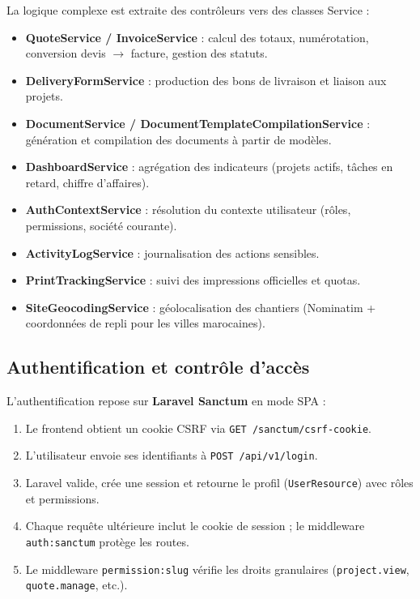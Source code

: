 La logique complexe est extraite des contrôleurs vers des classes Service :

\begin{itemize}
  \item \textbf{QuoteService / InvoiceService} : calcul des totaux, numérotation,
  conversion devis $\rightarrow$ facture, gestion des statuts.
  \item \textbf{DeliveryFormService} : production des bons de livraison et liaison
  aux projets.
  \item \textbf{DocumentService / DocumentTemplateCompilationService} : génération
  et compilation des documents à partir de modèles.
  \item \textbf{DashboardService} : agrégation des indicateurs (projets actifs,
  tâches en retard, chiffre d'affaires).
  \item \textbf{AuthContextService} : résolution du contexte utilisateur (rôles,
  permissions, société courante).
  \item \textbf{ActivityLogService} : journalisation des actions sensibles.
  \item \textbf{PrintTrackingService} : suivi des impressions officielles et quotas.
  \item \textbf{SiteGeocodingService} : géolocalisation des chantiers (Nominatim +
  coordonnées de repli pour les villes marocaines).
\end{itemize}

\subsection{Authentification et contrôle d'accès}

L'authentification repose sur \textbf{Laravel Sanctum} en mode SPA :

\begin{enumerate}
  \item Le frontend obtient un cookie CSRF via \texttt{GET /sanctum/csrf-cookie}.
  \item L'utilisateur envoie ses identifiants à \texttt{POST /api/v1/login}.
  \item Laravel valide, crée une session et retourne le profil (\texttt{UserResource})
  avec rôles et permissions.
  \item Chaque requête ultérieure inclut le cookie de session ; le middleware
  \texttt{auth:sanctum} protège les routes.
  \item Le middleware \texttt{permission:slug} vérifie les droits granulaires
  (\texttt{project.view}, \texttt{quote.manage}, etc.).
\end{enumerate}

